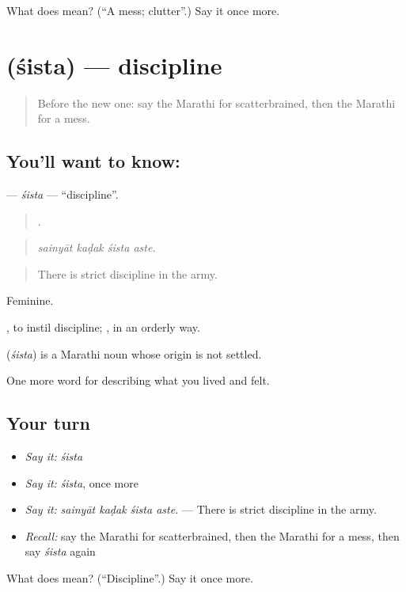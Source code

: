 \begin{tcolorbox}[breakable,colback=teal!4,colframe=teal!35!black,title={Before you move on}]
What does  mean? (\textquotedblleft{}A mess; clutter\textquotedblright{}.) Say it once more.
\end{tcolorbox}
\section[\texorpdfstring{\mr{शिस्त} (śista)}{शिस्त (śista)}]{ (śista) — discipline}

\label{lesson:MR-C474-sista}



\begin{quote}
Before the new one: say the Marathi for scatterbrained, then the Marathi for a mess.
\end{quote}

\subsection*{You'll want to know: }
\textbf{} — \emph{śista} — \textquotedblleft{}discipline\textquotedblright{}.

\begin{quote}
   .
\end{quote}

\begin{quote}
\emph{sainyāt kaḍak śista aste.}
\end{quote}

\begin{quote}
There is strict discipline in the army.
\end{quote}

Feminine.

 , to instil discipline; , in an orderly way.

\begin{cousinweb}
\textbf{} (\emph{śista}) is a Marathi noun whose origin is not settled.
\end{cousinweb}

\begin{grammarlens}[title={What you've built}]
One more word for describing what you lived and felt.
\end{grammarlens}

\subsection*{Your turn}
\begin{itemize}
\raggedright
  \item \emph{Say it:} \emph{śista}
  \item \emph{Say it:} \emph{śista}, once more
  \item \emph{Say it:} \emph{sainyāt kaḍak śista aste.} — There is strict discipline in the army.
  \item \emph{Recall:} say the Marathi for scatterbrained, then the Marathi for a mess, then say \emph{śista} again
\end{itemize}

\begin{tcolorbox}[breakable,colback=teal!4,colframe=teal!35!black,title={Before you move on}]
What does  mean? (\textquotedblleft{}Discipline\textquotedblright{}.) Say it once more.
\end{tcolorbox}
